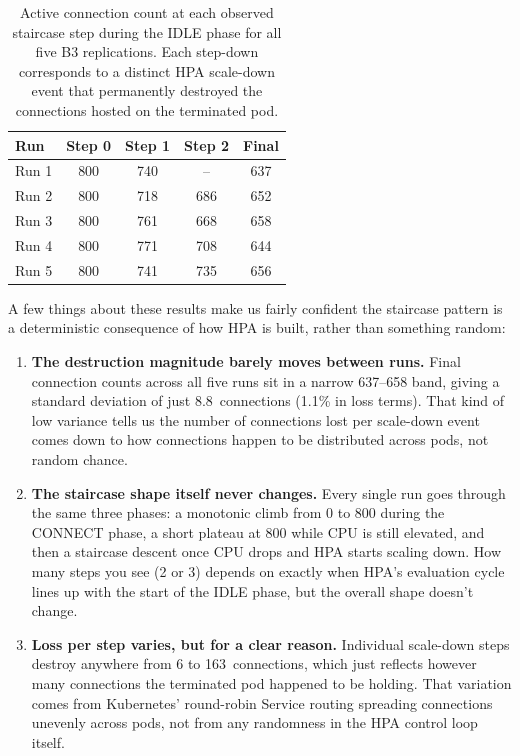 \documentclass[twocolumn]{svjour3}
\begin{document}
\begin{table}[ht]
\centering
\caption{Active connection count at each observed staircase step during the IDLE phase
for all five B3 replications. Each step-down corresponds to a distinct HPA scale-down
event that permanently destroyed the connections hosted on the terminated pod.}
\label{tab:b3_steps}
\begin{tabular}{@{}lcccc@{}}
\toprule
\textbf{Run} & \textbf{Step 0} & \textbf{Step 1} & \textbf{Step 2} & \textbf{Final} \\
\midrule
Run 1 & 800 & 740 & -- & 637 \\
Run 2 & 800 & 718 & 686 & 652 \\
Run 3 & 800 & 761 & 668 & 658 \\
Run 4 & 800 & 771 & 708 & 644 \\
Run 5 & 800 & 741 & 735 & 656 \\
\bottomrule
\end{tabular}
\end{table}

A few things about these results make us fairly confident the staircase pattern is
a deterministic consequence of how HPA is built, rather than something random:

\begin{enumerate}[leftmargin=*]
\item \textbf{The destruction magnitude barely moves between runs.} Final
connection counts across all five runs sit in a narrow 637--658 band, giving a
standard deviation of just 8.8~connections (1.1\% in loss terms). That kind of low
variance tells us the number of connections lost per scale-down event comes down to
how connections happen to be distributed across pods, not random chance.

\item \textbf{The staircase shape itself never changes.} Every single run goes
through the same three phases: a monotonic climb from 0 to 800 during the CONNECT
phase, a short plateau at 800 while CPU is still elevated, and then a staircase
descent once CPU drops and HPA starts scaling down. How many steps you see (2 or 3)
depends on exactly when HPA's evaluation cycle lines up with the start of the IDLE
phase, but the overall shape doesn't change.

\item \textbf{Loss per step varies, but for a clear reason.} Individual scale-down
steps destroy anywhere from 6 to 163~connections, which just reflects however many
connections the terminated pod happened to be holding. That variation comes from
Kubernetes' round-robin Service routing spreading connections unevenly across
pods, not from any randomness in the HPA control loop itself.
\end{enumerate}
\end{document}
